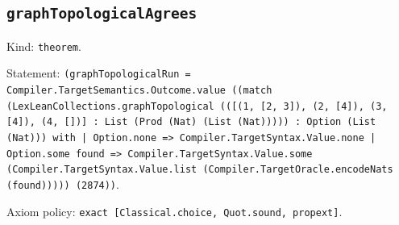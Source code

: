\documentclass[11pt]{article}
\begin{document}
\subsection*{\texttt{graphTopologicalAgrees}}
\noindent Kind: \texttt{theorem}.\par
\noindent Statement: \texttt{(graphTopologicalRun = Compiler.TargetSemantics.Outcome.value ((match (LexLeanCollections.graphTopological (([(1, [2, 3]), (2, [4]), (3, [4]), (4, [])] : List (Prod (Nat) (List (Nat))))) : Option (List (Nat))) with | Option.none => Compiler.TargetSyntax.Value.none | Option.some found => Compiler.TargetSyntax.Value.some (Compiler.TargetSyntax.Value.list (Compiler.TargetOracle.encodeNats (found))))) (2874))}.\par
\noindent Axiom policy: \texttt{exact [Classical.choice, Quot.sound, propext]}.\par
\end{document}
